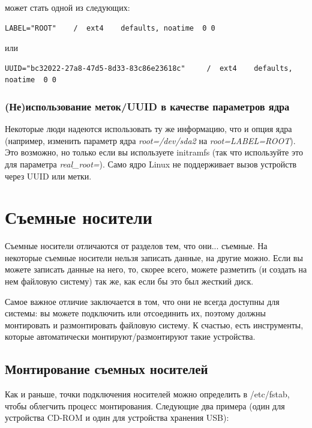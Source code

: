 \documentclass[10pt]{book}
\begin{document}
может стать одной из следующих:

\begin{tcolorbox} 
\begin{lstlisting}
LABEL="ROOT"    /  ext4    defaults, noatime  0 0
\end{lstlisting}
\end{tcolorbox}

или

\begin{tcolorbox} 
\begin{lstlisting}
UUID="bc32022-27a8-47d5-8d33-83c86e23618c"     /  ext4    defaults, noatime  0 0
\end{lstlisting}
\end{tcolorbox}
 
\subsubsection{(Не)использование меток/UUID в качестве параметров ядра}

Некоторые люди надеются использовать ту же информацию, что и опция ядра (например, изменить параметр ядра \textit{root=/dev/sda2} на \textit{root=LABEL=ROOT}). Это возможно, но только если вы используете initramfs (так что используйте это для параметра \textit{real\_root=}). Само ядро Linux не поддерживает вызов устройств через UUID или метки.

\section{Съемные носители}

Съемные носители отличаются от разделов тем, что они... съемные. На некоторые съемные носители нельзя записать данные, на другие можно. Если вы можете записать данные на него, то, скорее всего, можете разметить (и создать на нем файловую систему) так же, как если бы это был жесткий диск.

Самое важное отличие заключается в том, что они не всегда доступны для системы: вы можете подключить или отсоединить их, поэтому должны монтировать и размонтировать файловую систему. К счастью, есть инструменты, которые автоматически монтируют/размонтируют такие устройства.

\subsection{Монтирование съемных носителей}

Как и раньше, точки подключения носителей можно определить в /etc/fstab, чтобы облегчить процесс монтирования. Следующие два примера (один для устройства CD-ROM и один для устройства хранения USB):
\end{document}
